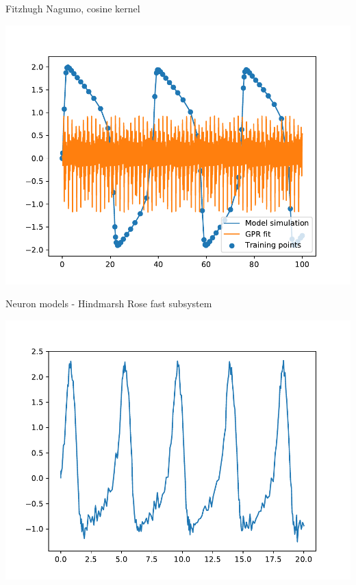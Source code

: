 \documentclass[presentation]{beamer}
\begin{document}
\begin{frame}[plain,label={sec:orgff5d456}]{Fitzhugh Nagumo, cosine kernel}
\begin{center}
\includegraphics[width=\textwidth]{./FH_CosineKernel.pdf}
\end{center}
\end{frame}

\begin{frame}[plain,label={sec:org6a9043a}]{Neuron models - Hindmarsh Rose fast subsystem}
\begin{center}
\includegraphics[width=\textwidth]{./noisy_HR_fast.pdf}
\end{center}
\end{frame}
\end{document}

